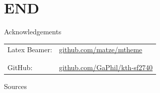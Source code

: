 \documentclass[10pt, compress]{beamer}
\begin{document}
\section{END}


\begin{frame}{Acknowledgements}
\begin{table}
\centering
\begin{tabular}{l l}
Latex Beamer: & \url{github.com/matze/mtheme}\\
& \\
& \\
GitHub: & \url{github.com/GaPhil/kth-sf2740}
\end{tabular}
\end{table}
\end{frame}

\begin{frame}{Sources}

\nocite{*}    
\end{frame}
\end{document}
